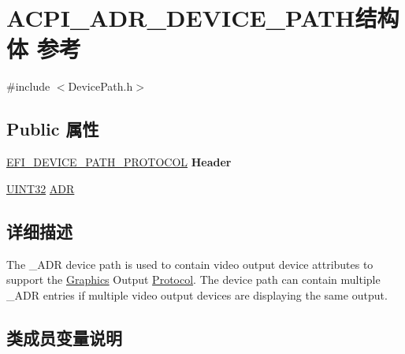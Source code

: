 \hypertarget{struct_a_c_p_i___a_d_r___d_e_v_i_c_e___p_a_t_h}{}\section{A\+C\+P\+I\+\_\+\+A\+D\+R\+\_\+\+D\+E\+V\+I\+C\+E\+\_\+\+P\+A\+T\+H结构体 参考}
\label{struct_a_c_p_i___a_d_r___d_e_v_i_c_e___p_a_t_h}


{\ttfamily \#include $<$Device\+Path.\+h$>$}

\subsection*{Public 属性}
\begin{DoxyCompactItemize}
\item 
\mbox{\label{struct_a_c_p_i___a_d_r___d_e_v_i_c_e___p_a_t_h_a2d5b040ed6970979409ae95d15be07d6}} 
\hyperlink{struct_e_f_i___d_e_v_i_c_e___p_a_t_h___p_r_o_t_o_c_o_l}{E\+F\+I\+\_\+\+D\+E\+V\+I\+C\+E\+\_\+\+P\+A\+T\+H\+\_\+\+P\+R\+O\+T\+O\+C\+OL} {\bfseries Header}
\item 
\hyperlink{_processor_bind_8h_ae1e6edbbc26d6fbc71a90190d0266018}{U\+I\+N\+T32} \hyperlink{struct_a_c_p_i___a_d_r___d_e_v_i_c_e___p_a_t_h_aad681f28f998a96df8bdd5d4cb611115}{A\+DR}
\end{DoxyCompactItemize}


\subsection{详细描述}
The \+\_\+\+A\+DR device path is used to contain video output device attributes to support the \hyperlink{class_graphics}{Graphics} Output \hyperlink{struct_protocol}{Protocol}. The device path can contain multiple \+\_\+\+A\+DR entries if multiple video output devices are displaying the same output. 

\subsection{类成员变量说明}
\mbox{\label{struct_a_c_p_i___a_d_r___d_e_v_i_c_e___p_a_t_h_aad681f28f998a96df8bdd5d4cb611115}} 

